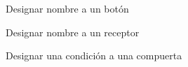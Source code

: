 \documentclass[a4paper]{article}
\begin{document}
\begin{figure}[!h]
	\caption{Designar nombre a un botón}
	\label{fig:diagrama20}
\end{figure}

\begin{figure}[!h]
	\caption{Designar nombre a un receptor}
	\label{fig:diagrama21}
\end{figure}

\begin{figure}[!h]
	\caption{Designar una condición a una compuerta}
	\label{fig:diagrama22}
\end{figure}
\end{document}
